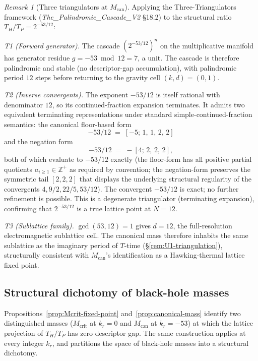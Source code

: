 \documentclass[11pt,a4paper]{article}
\theoremstyle{definition}
\theoremstyle{remark}
\newtheorem{remark}[theorem]{Remark}
\begin{document}
\begin{remark}[Three triangulators at $M_{\text{can}}$]\label{rem:canonical-triangulation}
Applying the Three-Triangulators framework (\textit{The\_\allowbreak Palindromic\_\allowbreak Cascade\_\allowbreak V2} \S18.2) to the structural ratio $T_{H}/T_{P} = 2^{-53/12}$:

\emph{T1 (Forward generator).} The cascade $(2^{-53/12})^{n}$ on the multiplicative manifold has generator residue $g = -53 \bmod 12 = 7$, a unit. The cascade is therefore palindromic and stable (no descriptor-gap accumulation), with palindromic period $12$ steps before returning to the gravity cell $(k,d) = (0,1)$.

\emph{T2 (Inverse convergents).} The exponent $-53/12$ is itself rational with denominator $12$, so its continued-fraction expansion terminates. It admits two equivalent terminating representations under standard simple-continued-fraction semantics: the canonical floor-based form
\[
-53/12 \;=\; [-5;\,1,\,1,\,2,\,2]
\]
and the negation form
\[
-53/12 \;=\; -[4;\,2,\,2,\,2],
\]
both of which evaluate to $-53/12$ exactly (the floor-form has all positive partial quotients $a_{i\ge 1} \in \mathbb{Z}^{+}$ as required by convention; the negation-form preserves the symmetric tail $[2,2,2]$ that displays the underlying structural regularity of the convergents $4, 9/2, 22/5, 53/12$). The convergent $-53/12$ is exact; no further refinement is possible. This is a degenerate triangulator (terminating expansion), confirming that $2^{-53/12}$ is a true lattice point at $N = 12$.

\emph{T3 (Sublattice family).} $\gcd(53, 12) = 1$ gives $d = 12$, the full-resolution electromagnetic sublattice cell. The canonical mass therefore inhabits the same sublattice as the imaginary period of $T$-time (\S\ref{rem:U1-triangulation}), structurally consistent with $M_{\text{can}}$'s identification as a Hawking-thermal lattice fixed point.
\end{remark}

\subsection{Structural dichotomy of black-hole masses}\label{subsec:BH-dichotomy}

Propositions~\ref{prop:Mcrit-fixed-point} and~\ref{prop:canonical-mass} identify two distinguished masses ($M_{\mathrm{crit}}$ at $k_{r}=0$ and $M_{\text{can}}$ at $k_{r}=-53$) at which the lattice projection of $T_{H}/T_{P}$ has zero descriptor gap. The same construction applies at every integer $k_{r}$, and partitions the space of black-hole masses into a structural dichotomy.
\end{document}
